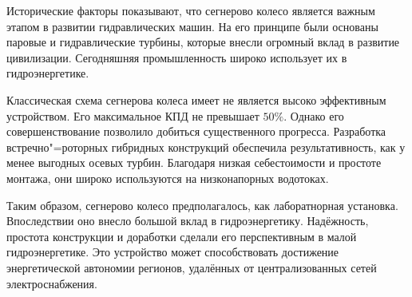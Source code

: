 Исторические факторы показывают, что сегнерово колесо является важным этапом в развитии гидравлических машин. На его принципе были основаны паровые и гидравлические турбины, которые внесли огромный вклад в развитие цивилизации. Сегодняшняя промышленность широко использует их в гидроэнергетике.
	
Классическая схема сегнерова колеса имеет не является высоко эффективным устройством. Его максимальное КПД не превышает $50\%$. Однако его совершенствование позволило добиться существенного прогресса. Разработка встречно"=роторных гибридных конструкций обеспечила результативность, как у менее выгодных осевых турбин. Благодаря низкая себестоимости и простоте монтажа, они широко используются на низконапорных водотоках. 
	
Таким образом, сегнерово колесо предполагалось, как лаборатнорная установка. Впоследствии оно внесло большой вклад в гидроэнергетику. Надёжность, простота конструкции и доработки сделали его перспективным в малой гидроэнергетике. Это устройство может способствовать достижение энергетической автономии регионов, удалённых от централизованных сетей электроснабжения.
